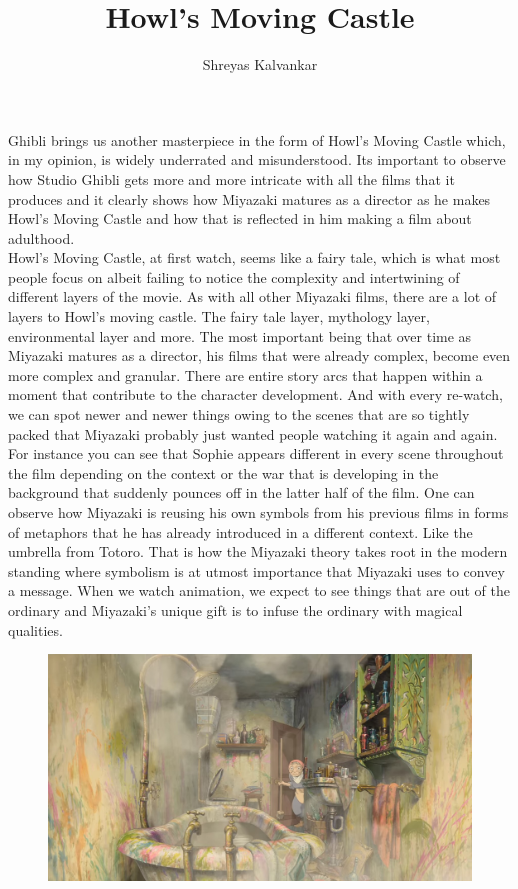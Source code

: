 \documentclass[11pt, letterpaper]{article}
\title{Howl's Moving Castle}
\author{Shreyas Kalvankar}
\begin{document}
\maketitle

\hspace{0.25 in}Ghibli brings us another masterpiece in the form of Howl's Moving Castle which, in my opinion, is widely underrated and misunderstood. Its important to observe how Studio Ghibli gets more and more intricate with all the films that it produces and it clearly shows how Miyazaki matures as a director as he makes Howl's Moving Castle and how that is reflected in him making a film about adulthood. \\
\hspace{0.25 in}Howl's Moving Castle, at first watch, seems like a fairy tale, which is what most people focus on albeit failing to notice the complexity and intertwining of different layers of the movie. As with all other Miyazaki films, there are a lot of layers to Howl's moving castle. The fairy tale layer, mythology layer, environmental layer and more. The most important being that over time as Miyazaki matures as a director, his films that were already complex, become even more complex and granular. There are entire story arcs that happen within a moment that contribute to the character development. And with every re-watch, we can spot newer and newer things owing to the scenes that are so tightly packed that Miyazaki probably just wanted people watching it again and again. For instance you can see that Sophie appears different in every scene throughout the film depending on the context or the war that is developing in the background that suddenly pounces off in the latter half of the film. One can observe how Miyazaki is reusing his own symbols from his previous films in forms of metaphors that he has already introduced in a different context. Like the umbrella from Totoro. That is how the Miyazaki theory takes root in the modern standing where symbolism is at utmost importance that Miyazaki uses to convey a message. When we watch animation, we expect to see things that are out of the ordinary and Miyazaki's unique gift is to infuse the ordinary with magical qualities. 

\begin{figure}[H]
\includegraphics[width=\textwidth]{cleaning.jpg}
\centering
\end{figure}
\end{document}
